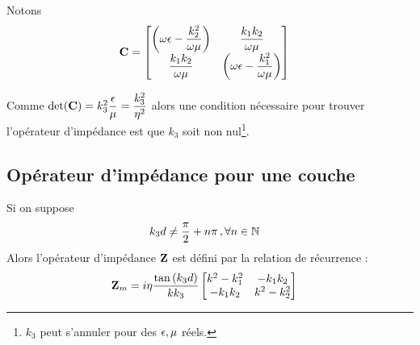     Notons
    \begin{align}
        \mC &=
        \begin{bmatrix}
            \left(\w\eps-\frac{k_2^2}{\w\mu}\right) & \frac{k_1k_2}{\w\mu}\\
            \frac{k_1k_2}{\w\mu} & \left(\w\eps-\frac{k_1^2}{\w\mu}\right)
        \end{bmatrix}
    \end{align}

    Comme $\det(\mC) = k_3^2\frac{\eps}{\mu}=\frac{k_3^2}{\eta^2}$ alors une condition nécessaire pour trouver l'opérateur d'impédance est que $k_3$ soit non nul\footnote{$k_3$ peut s'annuler pour des $\eps,\mu$ réels.}.





    \subsection{Opérateur d'impédance pour une couche}

        \begin{figure}[h!]
        \centering
        \begin{tikzpicture}
        
        \end{tikzpicture}
        \end{figure}

        \begin{thm}
            Si on suppose
                \begin{align}
                k_3d &\not = \frac{\pi}{2}+n\pi\,, \forall n \in \NN
            \end{align}
            Alors l'opérateur d'impédance $\mZ$ est défini par la relation de récurrence : 
            \begin{align}
            \mZ_m &= i\eta\frac{\tan\left(k_3d\right)}{kk_3}
                \begin{bmatrix}
                   k^2-k_1^2  & -k_1k_2\\
                    -k_1k_2 & k^2-k_2^2\\
                \end{bmatrix}
            \end{align}
        \end{thm}

